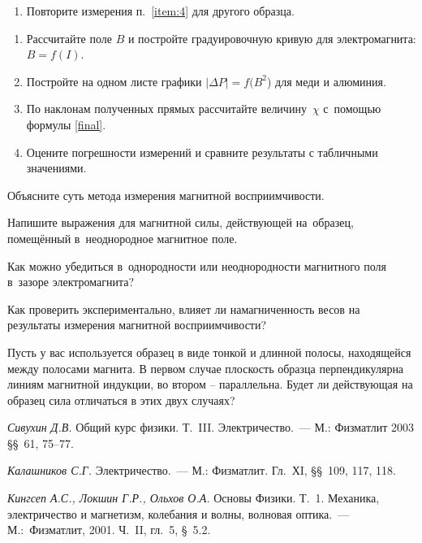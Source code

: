 \begin{lab:task}
\begin{enumerate}
\item Повторите измерения п.~\ref{item:4} для другого образца.

\end{enumerate}


\begin{enumerate}
	\item Рассчитайте поле $B$ и постройте градуировочную кривую для электромагнита: $B=f(I)$.
	\item Постройте на одном листе графики $|\Delta P|=f(B^2$) для меди и алюминия.
	\item По наклонам полученных прямых рассчитайте величину~$\chi$ с~помощью формулы \eqref{final}.
	\item Оцените погрешности измерений и сравните результаты с табличными значениями.
\end{enumerate}

\end{lab:task}


\begin{lab:questions}
	\item Объясните суть метода измерения магнитной восприимчивости.
	\item Напишите выражения для магнитной силы, действующей на~образец, помещённый в~неоднородное магнитное поле.
	\item Как можно убедиться в~однородности или неоднородности магнитного поля в~зазоре электромагнита?
	\item Как проверить экспериментально, влияет ли намагниченность весов на результаты измерения магнитной восприимчивости?
	\item Пусть у вас используется образец в виде тонкой и длинной полосы, находящейся между полосами магнита. В первом случае плоскость образца перпендикулярна линиям магнитной индукции, во втором – параллельна. Будет ли действующая на образец сила отличаться в этих двух случаях?
\end{lab:questions}


\begin{lab:literature}
	\item \emph{Сивухин Д.В.} Общий курс физики. Т.~III. Электричество.~--- М.: Физматлит 2003 \S\S~61, 75--77.
	\item \emph {Калашников С.Г.} Электричество.~--- М.: Физматлит. Гл.~ХI, \S\S~109, 117, 118.
	\item \emph{Кингсеп А.С., Локшин Г.Р., Ольхов О.А.} Основы Физики. Т.~1. Механика, электричество и магнетизм, колебания и волны, волновая оптика.~--- М.:~Физматлит, 2001. Ч.~II, гл.~5, \S~5.2.
\end{lab:literature}

